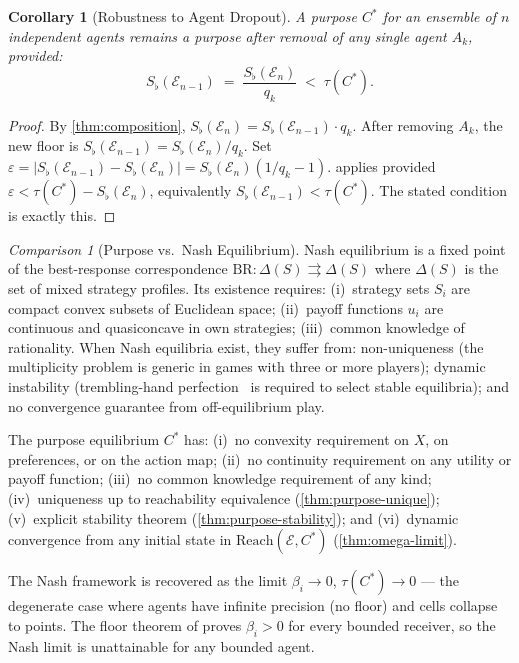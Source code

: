 \documentclass[twocolumn,11pt,a4paper]{article}
\newtheorem{corollary}[theorem]{Corollary}
\theoremstyle{remark}
\newtheorem{comparison}[theorem]{Comparison}
\newcommand{\Sflat}{S_{\flat}}
\newcommand{\Reach}{\mathrm{Reach}}
\newcommand{\tol}{\tau}
\newcommand{\Ens}{\mathcal{E}}            %
\begin{document}
\begin{corollary}[Robustness to Agent Dropout]
\label{cor:dropout}
A purpose $C^*$ for an ensemble of $n$ independent agents remains a purpose
after removal of any single agent $A_k$, provided:
\[
  \Sflat(\Ens_{n-1}) \;=\; \frac{\Sflat(\Ens_n)}{q_k} \;<\; \tol(C^*).
\]
\end{corollary}
\begin{proof}
By \cref{thm:composition}, $\Sflat(\Ens_n) = \Sflat(\Ens_{n-1}) \cdot q_k$.
After removing $A_k$, the new floor is $\Sflat(\Ens_{n-1}) = \Sflat(\Ens_n)/q_k$.
Set $\varepsilon = |\Sflat(\Ens_{n-1}) - \Sflat(\Ens_n)| = \Sflat(\Ens_n)
(1/q_k - 1)$.   applies provided $\varepsilon <
\tol(C^*) - \Sflat(\Ens_n)$, equivalently $\Sflat(\Ens_{n-1}) < \tol(C^*)$.
The stated condition is exactly this.
\end{proof}

\begin{comparison}[Purpose vs.\ Nash Equilibrium]
\label{comp:nash}
Nash equilibrium is a fixed point of the best-response correspondence $\mathrm{BR}:
\Delta(S) \rightrightarrows \Delta(S)$ where $\Delta(S)$ is the set of mixed
strategy profiles.  Its existence requires: (i)~strategy sets $S_i$ are
compact convex subsets of Euclidean space; (ii)~payoff functions $u_i$ are
continuous and quasiconcave in own strategies; (iii)~common knowledge of
rationality.  When Nash equilibria exist, they suffer from: non-uniqueness
(the multiplicity problem is generic in games with three or more players);
dynamic instability (trembling-hand perfection~\cite{vnm1944} is required to
select stable equilibria); and no convergence guarantee from off-equilibrium
play.

The purpose equilibrium $C^*$ has: (i)~no convexity requirement on $X$,
on preferences, or on the action map; (ii)~no continuity requirement on
any utility or payoff function; (iii)~no common knowledge requirement of
any kind; (iv)~uniqueness up to reachability equivalence
(\cref{thm:purpose-unique}); (v)~explicit stability theorem
(\cref{thm:purpose-stability}); and (vi)~dynamic convergence from any
initial state in $\Reach(\Ens, C^*)$ (\cref{thm:omega-limit}).

The Nash framework is recovered as the limit $\beta_i \to 0$,
$\tol(C^*) \to 0$ — the degenerate case where agents have infinite
precision (no floor) and cells collapse to points.  The floor theorem of
\cite{sachikonye2025agents} proves $\beta_i > 0$ for every bounded
receiver, so the Nash limit is unattainable for any bounded agent.
\end{comparison}
\end{document}
